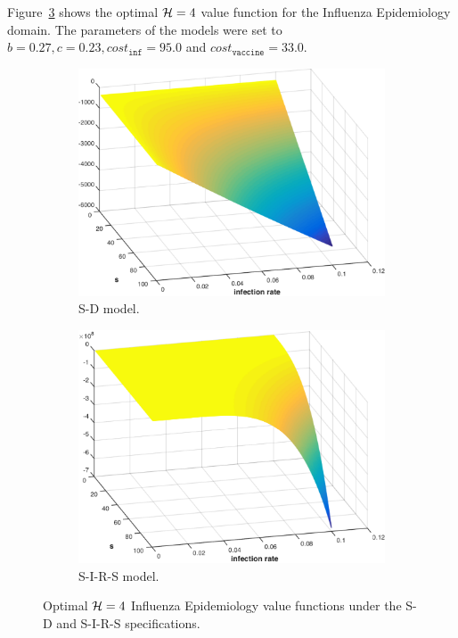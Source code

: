Figure~\ref{fig:epidemiology} shows the optimal {\footnotesize$ \mathcal{H} = 4 $} value function for the Influenza Epidemiology domain. The parameters of the models were set to $b = 0.27, c = 0.23, cost_{\mathtt{inf}} = 95.0$ and $cost_{\mathtt{vaccine}} = 33.0$.

\begin{figure}[t!]
    \centering
    \begin{subfigure}[b]{0.4\textwidth}
        \includegraphics[width=\linewidth, height=0.8\linewidth]{images/sd_infection_s.pdf}
        \caption{S-D model.}
        \label{fig:sd}
        \vspace{1em}
    \end{subfigure}
    
    \begin{subfigure}[b]{0.4\textwidth}
        \includegraphics[width=\linewidth, height=0.8\linewidth]{images/sir_infection_s}
        \caption{S-I-R-S model.}
        \label{fig:sirs}
    \end{subfigure}  
    \caption{Optimal $ \mathcal{H} = 4 $ Influenza Epidemiology value functions under the S-D and S-I-R-S specifications.}
    \label{fig:epidemiology}
\end{figure}
